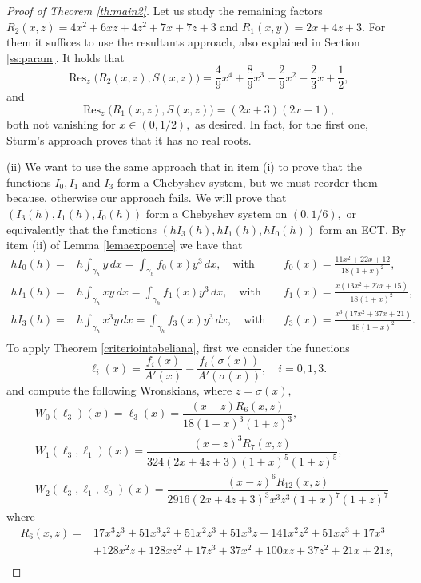 \documentclass[12pt,a4paper,reqno]{amsart}
\begin{document}
\begin{proof}[Proof of Theorem \ref{th:main2}]
Let us study the remaining factors $R_2(x,z)=4x^2+6xz+4z^2+7x+7z+3$
and $R_1(x,y)=2x+4z+3.$ For them it suffices to use the resultants
approach, also explained in Section \ref{ss:param}. It holds that
\[
\operatorname{Res}_z\big(R_2(x,z),S(x,z)\big)
=\frac49x^4+\frac89x^3-\frac29x^2-\frac23x+\frac12,
\]
and
\[
\operatorname{Res}_z\big(R_1(x,z),S(x,z)\big) =(2x+3)(2x-1),
\]
both not vanishing for $x\in(0,1/2),$ as desired. In fact, for the
first one, Sturm's approach proves that it has no real roots.


(ii) We want to use the same approach that in item (i) to prove that
the functions $I_0,I_1$ and $I_3$ form a Chebyshev system, but we
must reorder them because, otherwise our approach fails. We will
prove that $(I_3(h),I_1(h),I_0(h))$ form a Chebyshev system on
$(0,1/6),$ or equivalently that the functions
$(hI_3(h),hI_1(h),hI_0(h))$ form an ECT. By item (ii) of Lemma
\ref{lemaexpoente} we have that
\begin{align*}
hI_0(h)=& h \int_{\gamma_h} y\,dx= \int_{\gamma_h}f_0(x)
y^3\,dx,\quad\mbox{with} &&f_0(x)=
\frac{11x^2+22x+12}{18(1+x)^2},\\
hI_1(h)=& h \int_{\gamma_h} x y\,dx= \int_{\gamma_h}f_1(x)
y^3\,dx,\quad\mbox{with} &&f_1(x)=
\frac{x(13x^2+27x+15)}{18(1+x)^2},\\
hI_3(h)=& h \int_{\gamma_h} x^3 y\,dx=
\int_{\gamma_h}f_3(x)y^3\,dx,\quad\mbox{with} &&f_3(x)=
\frac{x^3(17x^2+37x+21)}{18(1+x)^2}.\\
\end{align*}
To apply Theorem \ref{criteriointabeliana}, first  we consider the
functions
\[
\ell_i(x)=\frac{f_i(x)}{A'(x)}-\frac{f_i(\sigma(x))}{A'(\sigma(x))},
\quad i=0,1,3.
\]
and compute the following Wronskians, where $z=\sigma(x),$
\begin{align*}
& W_0(\ell_3)(x) = \ell_3(x) = \dfrac{(x-z)R_6(x,z)}{18(1+x)^3(1+z)^3}, \\
    & W_1(\ell_3, \ell_1)(x) = \dfrac{(x-z)^3R_7(x,z)}
    {324(2x+4z+3)(1+x)^5(1+z)^5}, \\
      & W_2(\ell_3, \ell_1,\ell_0)(x) = \dfrac{(x-z)^6R_{12}(x,z)}
      {2916(2x+4z+3)^3x^3z^3(1+x)^7(1+z)^7}
\end{align*}
where
\begin{align*}
R_6(x,z)=&17 {x}^{3}{z}^{3}+51 {x}^{3}{z}^{2}+51 {x}^{2}{z}^{3}+51
{x}^{3}z+ 141 {x}^{2}{z}^{2}+51 x{z}^{3}+17 {x}^{3}\\&+128
{x}^{2}z+128 x{z}^{
2}+17 {z}^{3}+37 {x}^{2}+100 xz+37 {z}^{2}+21 x+21 z,\\

\end{align*}
\end{proof}
\end{document}
